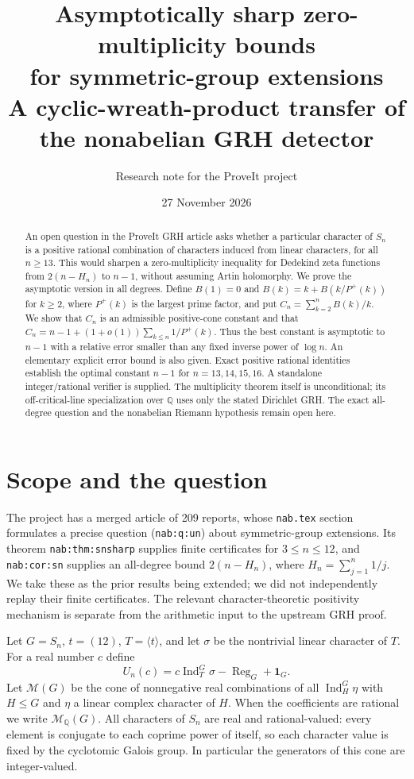 \documentclass[11pt]{article}
\title{Asymptotically sharp zero-multiplicity bounds\\for symmetric-group extensions\\[4pt]\large A cyclic-wreath-product transfer of the nonabelian GRH detector}
\author{Research note for the ProveIt project}
\date{27 November 2026}
\theoremstyle{remark}
\newcommand{\Ind}{\operatorname{Ind}}
\newcommand{\Reg}{\operatorname{Reg}}
\newcommand{\Cone}{\mathcal{M}}
\newcommand{\Q}{\mathbb Q}
\newcommand{\one}{\mathbf 1}
\begin{document}
\maketitle
\begin{abstract}
An open question in the ProveIt GRH article asks whether a particular character of $S_n$ is a positive rational combination of characters induced from linear characters, for all $n\ge13$. This would sharpen a zero-multiplicity inequality for Dedekind zeta functions from $2(n-H_n)$ to $n-1$, without assuming Artin holomorphy. We prove the asymptotic version in all degrees. Define $B(1)=0$ and $B(k)=k+B(k/P^+(k))$ for $k\ge2$, where $P^+(k)$ is the largest prime factor, and put $C_n=\sum_{k=2}^n B(k)/k$. We show that $C_n$ is an admissible positive-cone constant and that $C_n=n-1+(1+o(1))\sum_{k\le n}1/P^+(k)$. Thus the best constant is asymptotic to $n-1$ with a relative error smaller than any fixed inverse power of $\log n$. An elementary explicit error bound is also given. Exact positive rational identities establish the optimal constant $n-1$ for $n=13,14,15,16$. A standalone integer/rational verifier is supplied. The multiplicity theorem itself is unconditional; its off-critical-line specialization over $\Q$ uses only the stated Dirichlet GRH. The exact all-degree question and the nonabelian Riemann hypothesis remain open here.
\end{abstract}

\section{Scope and the question}
The project \cite{project} has a merged article of 209 reports, whose \texttt{nab.tex} section \cite{nab} formulates a precise question (\texttt{nab:q:un}) about symmetric-group extensions. Its theorem \texttt{nab:thm:snsharp} supplies finite certificates for $3\le n\le12$, and \texttt{nab:cor:sn} supplies an all-degree bound $2(n-H_n)$, where $H_n=\sum_{j=1}^n1/j$. We take these as the prior results being extended; we did not independently replay their finite certificates. The relevant character-theoretic positivity mechanism is separate from the arithmetic input to the upstream GRH proof.

Let $G=S_n$, $t=(12)$, $T=\langle t\rangle$, and let $\sigma$ be the nontrivial linear character of $T$. For a real number $c$ define
\begin{equation}\label{eq:U}
 U_n(c)=c\Ind_T^G\sigma-\Reg_G+\one_G.
\end{equation}
Let $\Cone(G)$ be the cone of nonnegative real combinations of all $\Ind_H^G\eta$ with $H\le G$ and $\eta$ a linear complex character of $H$. When the coefficients are rational we write $\Cone_{\Q}(G)$. All characters of $S_n$ are real and rational-valued: every element is conjugate to each coprime power of itself, so each character value is fixed by the cyclotomic Galois group. In particular the generators of this cone are integer-valued.
\end{document}
